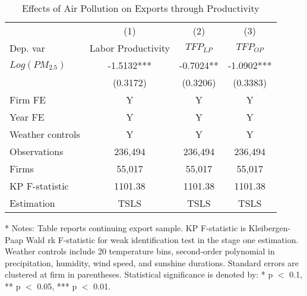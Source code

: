 \documentclass[12pt]{article}
\begin{document}
\begin{table}[H]
\begin{tablenotes}
  \end{tablenotes}
  \end{table}



    \begin{table}[H]\centering
      \renewcommand{\thetable}{\arabic{table}a}
        \caption{Effects of Air Pollution on Exports through Productivity} \label{tab:mechan_tfp}
        \begin{tabular}{l*{3}{c}}
          \hline\hline
          &\multicolumn{1}{c}{(1)}&\multicolumn{1}{c}{(2)}&\multicolumn{1}{c}{(3)}\\
          Dep. var  &\multicolumn{1}{c}{Labor Productivity}&\multicolumn{1}{c}{$TFP_{LP}$}&\multicolumn{1}{c}{$TFP_{OP}$}\\ 
          \hline
          $Log(PM_{2.5})$  &-1.5132***&-0.7024**&-1.0902***\\
                            &(0.3172)&(0.3206)&(0.3383)\\
          \hline
          Firm FE &Y&Y&Y\\
          Year FE &Y&Y&Y\\
          Weather controls &Y&Y&Y\\
          \hline
          Observations   &236,494&236,494&236,494\\
          Firms          &55,017 &55,017 &55,017\\
          KP F-statistic	&1101.38	&1101.38	&1101.38\\
          Estimation      &TSLS&TSLS&TSLS\\
          \hline\hline
        \end{tabular}
        \begin{tablenotes}
          \item[*] \small Notes: Table reports continuing export sample. KP F-statistic is Kleibergen-Paap Wald rk F-statistic for weak identification test in the stage one estimation. Weather controls include 20 temperature bins, second-order polynomial in precipitation, humidity, wind speed, and sunshine durations. Standard errors are clustered at firm in parentheses. Statistical significance is denoted by: * p $<$ 0.1, ** p $<$ 0.05, *** p $<$ 0.01.
        \end{tablenotes}
        \end{table}
        
\end{document}
